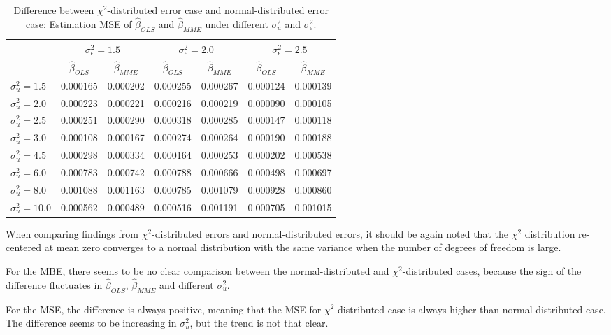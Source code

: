 \documentclass{article}
\begin{document}
\begin{table}[ht]
    \centering
    \caption{Difference between $\chi^2$-distributed error case and normal-distributed error case: Estimation MSE of $\hat{\beta}_{OLS}$ and $\hat{\beta}_{MME}$ under different $\sigma^2_u$ and $\sigma^2_\epsilon$.}
    \label{Tab:MSE_diff_chi_normal}
    \begin{tabular}[t]{lcccccc}
        \hline
        &\multicolumn{2}{c}{$\sigma^2_\epsilon=1.5$}&\multicolumn{2}{c}{$\sigma^2_\epsilon=2.0$}&\multicolumn{2}{c}{$\sigma^2_\epsilon=2.5$}\\
        \hline
        &$\hat{\beta}_{OLS}$&$\hat{\beta}_{MME}$&$\hat{\beta}_{OLS}$&$\hat{\beta}_{MME}$&$\hat{\beta}_{OLS}$&$\hat{\beta}_{MME}$\\
        \hline
        $\sigma^2_u = 1.5$&0.000165&0.000202&0.000255&0.000267&0.000124&0.000139\\
        $\sigma^2_u = 2.0$&0.000223&0.000221&0.000216&0.000219&0.000090&0.000105\\
        $\sigma^2_u = 2.5$&0.000251&0.000290&0.000318&0.000285&0.000147&0.000118\\
        $\sigma^2_u = 3.0$&0.000108&0.000167&0.000274&0.000264&0.000190&0.000188\\
        $\sigma^2_u = 4.5$&0.000298&0.000334&0.000164&0.000253&0.000202&0.000538\\
        $\sigma^2_u = 6.0$&0.000783&0.000742&0.000788&0.000666&0.000498&0.000697\\
        $\sigma^2_u = 8.0$&0.001088&0.001163&0.000785&0.001079&0.000928&0.000860\\
        $\sigma^2_u = 10.0$&0.000562&0.000489&0.000516&0.001191&0.000705&0.001015\\
        \hline
    \end{tabular}
\end{table}

When comparing findings from $\chi^2$-distributed errors and normal-distributed errors, it should be again noted that
the $\chi^2$ distribution re-centered at mean zero converges to a normal distribution with the same variance when the number of degrees of freedom is large.

For the MBE, there seems to be no clear comparison between the normal-distributed and $\chi^2$-distributed cases,
because the sign of the difference fluctuates in $\hat{\beta}_{OLS}$, $\hat{\beta}_{MME}$ and different $\sigma^2_u$.

For the MSE, the difference is always positive, meaning that the MSE for $\chi^2$-distributed case is always higher than normal-distributed case.
The difference seems to be increasing in $\sigma^2_u$, but the trend is not that clear. 
\end{document}
